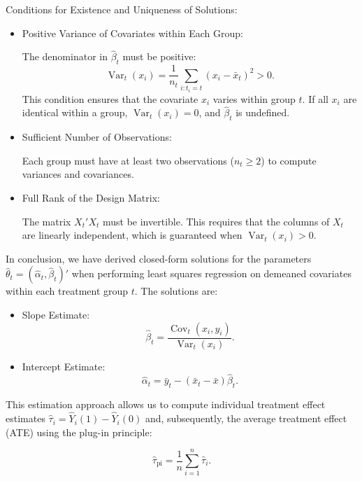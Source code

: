 \documentclass{article}
\begin{document}
Conditions for Existence and Uniqueness of Solutions:

\begin{itemize}
    \item Positive Variance of Covariates within Each Group:

    The denominator in \(\hat{\beta}_t\) must be positive:
    \[
    \operatorname{Var}_t(x_i) = \frac{1}{n_t} \sum_{i: t_i = t} (x_i - \bar{x}_t)^2 > 0.
    \]
    This condition ensures that the covariate \(x_i\) varies within group \(t\). If all \(x_i\) are identical within a group, \(\operatorname{Var}_t(x_i) = 0\), and \(\hat{\beta}_t\) is undefined.

    \item Sufficient Number of Observations:

    Each group must have at least two observations (\(n_t \geq 2\)) to compute variances and covariances.

    \item Full Rank of the Design Matrix:

    The matrix \(X_t' X_t\) must be invertible. This requires that the columns of \(X_t\) are linearly independent, which is guaranteed when \(\operatorname{Var}_t(x_i) > 0\).
\end{itemize}

In conclusion, we have derived closed-form solutions for the parameters \(\hat{\theta}_t = (\hat{\alpha}_t, \hat{\beta}_t)'\) when performing least squares regression on demeaned covariates within each treatment group \(t\). The solutions are:

\begin{itemize}
    \item Slope Estimate:
    \[
    \hat{\beta}_t = \frac{ \operatorname{Cov}_t(x_i, y_i) }{ \operatorname{Var}_t(x_i) }.
    \]
    \item Intercept Estimate:
    \[
    \hat{\alpha}_t = \bar{y}_t - (\bar{x}_t - \bar{x}) \hat{\beta}_t.
    \]
\end{itemize}

This estimation approach allows us to compute individual treatment effect estimates \(\hat{\tau}_i = \hat{Y}_i(1) - \hat{Y}_i(0)\) and, subsequently, the average treatment effect (ATE) using the plug-in principle:

\[
\hat{\tau}_{\text{pi}} = \frac{1}{n} \sum_{i=1}^{n} \hat{\tau}_i.
\]
\end{document}
